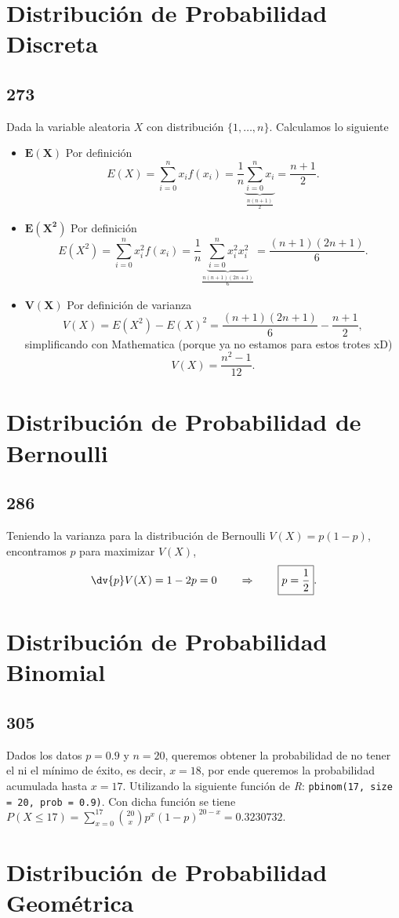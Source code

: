 \section{Distribución de Probabilidad Discreta}
\subsection*{273}
Dada la variable aleatoria $X$ con distribución $\{ 1,\ldots ,n \}$. Calculamos lo siguiente
\begin{itemize}
	\item $\mathbf{E(X)}$ Por definición
		$$E(X) = \sum _{i=0} ^n x_i f(x_i) = \frac{1}{n} \underbrace{\sum _{i=0} ^n x_i}_{\frac{n(n+1)}{2}} = \frac{n+1}{2}.$$
	\item $\mathbf{E(X^2)}$ Por definición
		$$E(X^2) = \sum _{i=0} ^n x_i ^2 f(x_i) = \frac{1}{n} \underbrace{\sum _{i=0} ^n x_i ^2 x_i ^2}_{\frac{n(n+1)(2n+1)}{6}} = \frac{(n+1)(2n+1)}{6} .$$
	\item $\mathbf{V(X)}$ Por definición de varianza
		$$V(X) = E(X^2) - E(X)^2 = \frac{(n+1)(2n+1)}{6} - \frac{n+1}{2},$$
	simplificando con Mathematica (porque ya no estamos para estos trotes xD)
		$$V(X) = \frac{n^2 - 1}{12} .$$
\end{itemize}

\section{Distribución de Probabilidad de Bernoulli}
\subsection*{286}
Teniendo la varianza para la distribución de Bernoulli $V(X) = p(1-p)$, encontramos $p$ para maximizar $V(X)$,
	$$\dv{p} V(X) = 1-2p = 0 \quad \quad \Rightarrow \quad \quad \boxed{p=\frac{1}{2}}.$$
\section{Distribución de Probabilidad Binomial}
\subsection*{305}
Dados los datos $p = 0.9$ y $n = 20$, queremos obtener la probabilidad de no tener el ni el mínimo de éxito, es decir, $x = 18$, por ende queremos la probabilidad acumulada hasta $x = 17$. Utilizando la siguiente función de \textit{R}: \texttt{pbinom(17, size = 20, prob = 0.9)}. Con dicha función se tiene $P(X\leq 17) = \displaystyle\sum _{x=0} ^{17} \binom{20}{x} p^x (1-p)^{20-x} = 0.3230732.$
\section{Distribución de Probabilidad Geométrica}